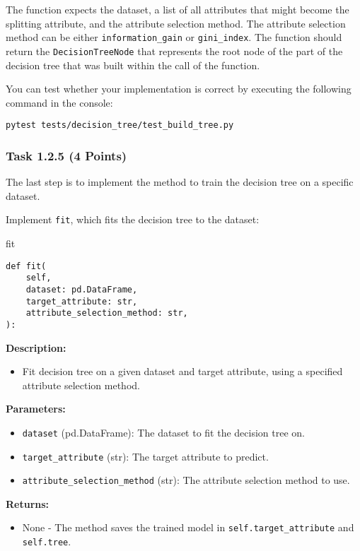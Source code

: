 \documentclass[
english,
smallborders
]{i6prcsht}
\newcommand{\points}[1]{\hfill \color{red}(#1 Points)\color{black}}
\begin{document}
The function expects the dataset, a list of all attributes that might become the splitting attribute, and the attribute selection method. The attribute selection method can be either \texttt{information\_gain} or \texttt{gini\_index}. The function should return the \texttt{DecisionTreeNode} that represents the root node of the part of the decision tree that was built within the call of the function.

You can test whether your implementation is correct by executing the following command in the console:

\vspace*{0.3cm}

\begin{lstlisting}
pytest tests/decision_tree/test_build_tree.py
\end{lstlisting}

\newpage

\subsubsection*{Task 1.2.5 \points{4}}

The last step is to implement the method to train the decision tree on a specific dataset.

Implement \texttt{fit}, which fits the decision tree to the dataset:

\vspace*{0.3cm}

\begin{functionbox}{fit}
	\begin{lstlisting}[numbers=none]
def fit(
    self, 
    dataset: pd.DataFrame,
    target_attribute: str, 
    attribute_selection_method: str,
):
\end{lstlisting}
	
	\textbf{Description:}
	\begin{itemize}[leftmargin=*,topsep=0pt]
		\item Fit decision tree on a given dataset and target attribute, using a specified attribute selection method.
	\end{itemize}
	
	\textbf{Parameters:}
	\begin{itemize}[leftmargin=*,topsep=0pt]
		\item \texttt{dataset} (pd.DataFrame): The dataset to fit the decision tree on.
		\item \texttt{target\_attribute} (str): The target attribute to predict.
		\item \texttt{attribute\_selection\_method} (str): The attribute selection method to use.
	\end{itemize}
	
	\textbf{Returns:}
	\begin{itemize}[leftmargin=*,topsep=0pt]
		\item None - The method saves the trained model in \texttt{self.target\_attribute} and \texttt{self.tree}.
	\end{itemize}
\end{functionbox}
\end{document}

